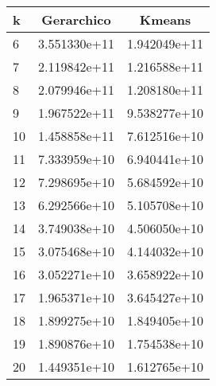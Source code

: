 \begin{tabular}{lcc}
	\toprule
	k  & Gerarchico   & Kmeans       \\
	\midrule
	6  & 3.551330e+11 & 1.942049e+11 \\
	7  & 2.119842e+11 & 1.216588e+11 \\
	8  & 2.079946e+11 & 1.208180e+11 \\
	9  & 1.967522e+11 & 9.538277e+10 \\
	10 & 1.458858e+11 & 7.612516e+10 \\
	11 & 7.333959e+10 & 6.940441e+10 \\
	12 & 7.298695e+10 & 5.684592e+10 \\
	13 & 6.292566e+10 & 5.105708e+10 \\
	14 & 3.749038e+10 & 4.506050e+10 \\
	15 & 3.075468e+10 & 4.144032e+10 \\
	16 & 3.052271e+10 & 3.658922e+10 \\
	17 & 1.965371e+10 & 3.645427e+10 \\
	18 & 1.899275e+10 & 1.849405e+10 \\
	19 & 1.890876e+10 & 1.754538e+10 \\
	20 & 1.449351e+10 & 1.612765e+10 \\
	\bottomrule
\end{tabular}
